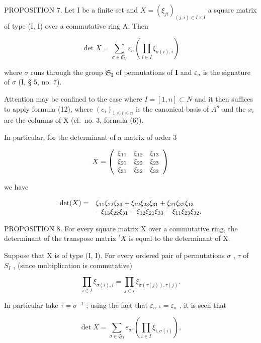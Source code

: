 PROPOSITION 7. Let I be a finite set and \(X = (\xi_{ji})_{(j, i) \in I \times I}\) a square matrix of type (I, I) over a commutative ring A. Then

\[
\det X = \sum_ {\sigma \in \mathfrak {S} _ {I}} \varepsilon_ {\sigma} \left(\prod_ {i \in I} \xi_ {\sigma (i), i}\right)\tag{14}
\]

where \(\sigma\) runs through the group \(\mathfrak{S}_{\mathbf{I}}\) of permutations of \(\mathbf{I}\) and \(\varepsilon_{\sigma}\) is the signature of \(\sigma\) (I, § 5, no. 7).

Attention may be confined to the case where \(I = [1, n] \subset N\) and it then suffices to apply formula (12), where \((e_{i})_{1 \leqslant i \leqslant n}\) is the canonical basis of \(A^{n}\) and the \(x_{i}\) are the columns of X (cf.~no. 3, formula (6)).

In particular, for the determinant of a matrix of order 3

\[
X = \left( \begin{array}{c c c} \xi_ {1 1} & \xi_ {1 2} & \xi_ {1 3} \\ \xi_ {2 1} & \xi_ {2 2} & \xi_ {2 3} \\ \xi_ {3 1} & \xi_ {3 2} & \xi_ {3 3} \end{array} \right)
\]

we have

\[
\begin{array}{r l} \det (X) = & \xi_ {1 1} \xi_ {2 2} \xi_ {3 3} + \xi_ {1 2} \xi_ {2 3} \xi_ {3 1} + \xi_ {2 1} \xi_ {3 2} \xi_ {1 3} \\ & - \xi_ {1 3} \xi_ {2 2} \xi_ {3 1} - \xi_ {1 2} \xi_ {2 1} \xi_ {3 3} - \xi_ {1 1} \xi_ {2 3} \xi_ {3 2}. \end{array}
\]

PROPOSITION 8. For every square matrix X over a commutative ring, the determinant of the transpose matrix \(^{t}X\) is equal to the determinant of X.

Suppose that X is of type (I, I). For every ordered pair of permutations \(\sigma\) , \(\tau\) of \(S_{I}\) , (since multiplication is commutative)

\[
\prod_ {i \in I} \xi_ {\sigma (i), i} = \prod_ {j \in I} \xi_ {\sigma (\tau (j)), \tau (j)}.
\]

In particular take \(\tau = \sigma^{-1}\) ; using the fact that \(\varepsilon_{\sigma^{-1}} = \varepsilon_{\sigma}\) , it is seen that

\[
\det X = \sum_ {\sigma \in \mathfrak {S} _ {I}} \varepsilon_ {\sigma}. \left(\prod_ {i \in I} \xi_ {i, \sigma (i)}\right),\tag{15}
\]

